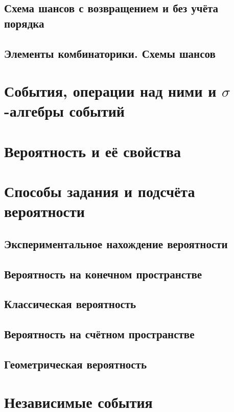 \subsection{Схема шансов с возвращением и без учёта порядка}

\subsection{Элементы комбинаторики. Схемы шансов}


\section{События, операции над ними и $\sigma$-алгебры событий}

\section{Вероятность и её свойства}


\section{Способы задания и подсчёта вероятности}

\subsection{Экспериментальное нахождение вероятности}


\subsection{Вероятность на конечном пространстве}

\subsection{Классическая вероятность}

\subsection{Вероятность на счётном пространстве}

\subsection{Геометрическая вероятность}

\section{Независимые события}

